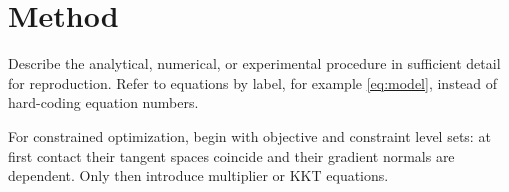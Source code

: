 \section{Method}
\label{sec:method}

Describe the analytical, numerical, or experimental procedure in sufficient
detail for reproduction. Refer to equations by label, for example
\cref{eq:model}, instead of hard-coding equation numbers.

For constrained optimization, begin with objective and constraint level sets:
at first contact their tangent spaces coincide and their gradient normals are
dependent. Only then introduce multiplier or KKT equations.
